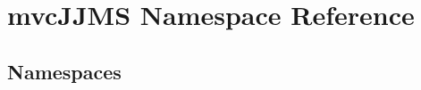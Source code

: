 \hypertarget{namespacemvc_j_j_m_s}{}\section{mvc\+J\+J\+MS Namespace Reference}
\label{namespacemvc_j_j_m_s}
\subsection*{Namespaces}
\begin{DoxyCompactItemize}
\end{DoxyCompactItemize}
